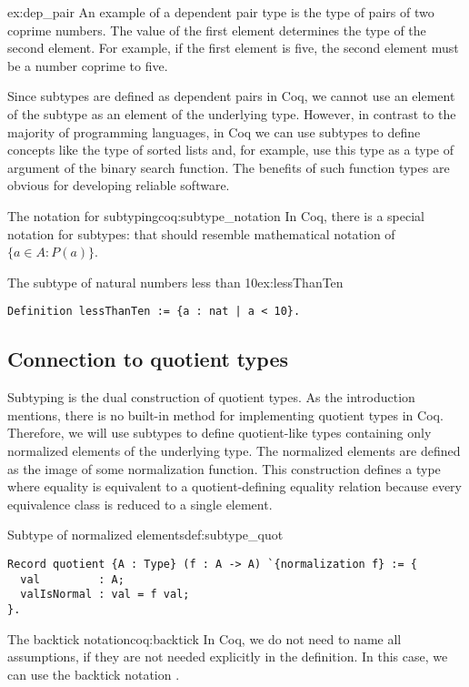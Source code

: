 \begin{example}{}{ex:dep_pair}
An example of a dependent pair type is the type of pairs of two coprime numbers. The value of the first element determines the type of the second element. For example, if the first element is five, the second element must be a number coprime to five.
\end{example}
Since subtypes are defined as dependent pairs in Coq, we cannot use an element of the subtype as an element of the underlying type. However, in contrast to the majority of programming languages, in Coq we can use subtypes to define concepts like the type of sorted lists and, for example, use this type as a type of argument of the binary search function. The benefits of such function types are obvious for developing reliable software.
\begin{coq}{The notation for subtyping}{coq:subtype_notation}
In Coq, there is a special notation for subtypes:  that should resemble mathematical notation of $\{a \in A: P(a)\}$.
\end{coq}
\begin{example}{The subtype of natural numbers less than 10}{ex:lessThanTen}
\begin{verbatim}
Definition lessThanTen := {a : nat | a < 10}.
\end{verbatim}
\end{example}
\subsection{Connection to quotient types}
Subtyping is the dual construction of quotient types. As the introduction mentions, there is no built-in method for implementing quotient types in Coq. Therefore, we will use subtypes to define quotient-like types containing only normalized elements of the underlying type. The normalized elements are defined as the image of some normalization function. This construction defines a type where equality is equivalent to a quotient-defining equality relation because every equivalence class is reduced to a single element.
\begin{defi}{Subtype of normalized elements}{def:subtype_quot}
\begin{verbatim}
Record quotient {A : Type} (f : A -> A) `{normalization f} := {
  val         : A;
  valIsNormal : val = f val;
}.
\end{verbatim}
\end{defi}
\begin{coq}{The backtick notation}{coq:backtick}
In Coq, we do not need to name all assumptions, if they are not needed explicitly in the definition. In this case, we can use the backtick notation .
\end{coq}
